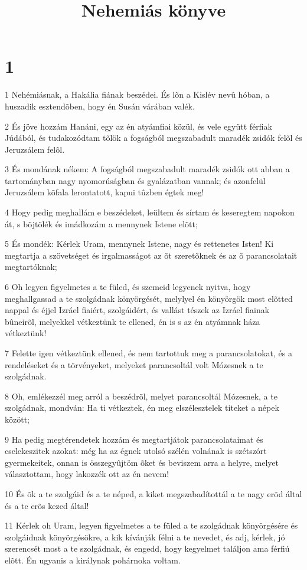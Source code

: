 

\title{Nehemiás könyve}


\chapter{1}

\par 1 Nehémiásnak, a Hakália fiának beszédei. És lõn a Kislév nevû hóban, a huszadik esztendõben, hogy én Susán várában valék.
\par 2 És jöve hozzám Hanáni, egy az én atyámfiai közül, és vele együtt férfiak Júdából, és tudakozódtam tõlök a fogságból megszabadult maradék zsidók felõl és Jeruzsálem felõl.
\par 3 És mondának nékem: A fogságból megszabadult maradék zsidók ott abban a tartományban nagy nyomorúságban és gyalázatban vannak; és azonfelül Jeruzsálem kõfala lerontatott, kapui tûzben égtek meg!
\par 4 Hogy pedig meghallám e beszédeket, leültem és sírtam és keseregtem napokon át, s bõjtölék és imádkozám a mennynek Istene elõtt;
\par 5 És mondék: Kérlek Uram, mennynek Istene, nagy és rettenetes Isten! Ki megtartja a szövetséget és irgalmasságot  az õt szeretõknek és az õ parancsolatait megtartóknak;
\par 6 Oh legyen figyelmetes a te füled, és szemeid legyenek nyitva, hogy meghallgassad a te szolgádnak könyörgését, melylyel én könyörgök most elõtted nappal és éjjel Izráel fiaiért, szolgáidért, és vallást tészek az Izráel fiainak bûneirõl, melyekkel vétkeztünk te ellened, én is s az én atyámnak háza vétkeztünk!
\par 7 Felette igen vétkeztünk ellened, és nem tartottuk meg a parancsolatokat, és a rendeléseket és a törvényeket, melyeket parancsoltál volt Mózesnek a te szolgádnak.
\par 8 Oh, emlékezzél meg arról a beszédrõl, melyet parancsoltál Mózesnek, a te szolgádnak, mondván: Ha ti vétkeztek, én meg elszélesztelek titeket a népek között;
\par 9 Ha pedig megtérendetek hozzám és megtartjátok parancsolataimat és cselekeszitek azokat: még ha az égnek utolsó szélén volnának is szétszórt gyermekeitek, onnan is összegyûjtöm õket és beviszem arra a helyre, melyet választottam, hogy lakozzék ott az én nevem!
\par 10 És õk a te szolgáid és a te néped, a kiket megszabadítottál a te nagy erõd által és a te erõs kezed által!
\par 11 Kérlek oh Uram, legyen figyelmetes a te füled a te szolgádnak könyörgésére és szolgáidnak könyörgésökre, a kik kívánják félni a te nevedet, és adj, kérlek, jó szerencsét most a te szolgádnak, és engedd, hogy kegyelmet találjon ama férfiú elõtt. Én ugyanis a királynak pohárnoka voltam.

